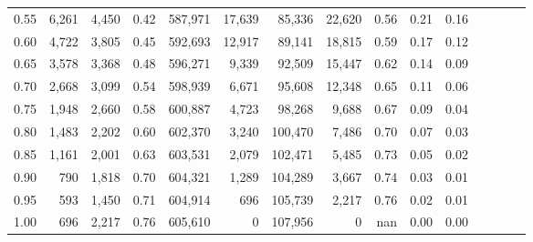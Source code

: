 \begin{tabular}{rrrcrrrrrrrrrrr}
0.55 &    6,261 &   4,450 &                                       0.42 &  587,971 &   17,639 &   85,336 &   22,620 &  0.56 &  0.21 &                         0.16 \\
0.60 &    4,722 &   3,805 &                                       0.45 &  592,693 &   12,917 &   89,141 &   18,815 &  0.59 &  0.17 &                         0.12 \\
0.65 &    3,578 &   3,368 &                                       0.48 &  596,271 &    9,339 &   92,509 &   15,447 &  0.62 &  0.14 &                         0.09 \\
0.70 &    2,668 &   3,099 &                                       0.54 &  598,939 &    6,671 &   95,608 &   12,348 &  0.65 &  0.11 &                         0.06 \\
0.75 &    1,948 &   2,660 &                                       0.58 &  600,887 &    4,723 &   98,268 &    9,688 &  0.67 &  0.09 &                         0.04 \\
0.80 &    1,483 &   2,202 &                                       0.60 &  602,370 &    3,240 &  100,470 &    7,486 &  0.70 &  0.07 &                         0.03 \\
0.85 &    1,161 &   2,001 &                                       0.63 &  603,531 &    2,079 &  102,471 &    5,485 &  0.73 &  0.05 &                         0.02 \\
0.90 &      790 &   1,818 &                                       0.70 &  604,321 &    1,289 &  104,289 &    3,667 &  0.74 &  0.03 &                         0.01 \\
0.95 &      593 &   1,450 &                                       0.71 &  604,914 &      696 &  105,739 &    2,217 &  0.76 &  0.02 &                         0.01 \\
1.00 &      696 &   2,217 &                                       0.76 &  605,610 &        0 &  107,956 &        0 &   nan &  0.00 &                         0.00 \\
\bottomrule
\end{tabular}
